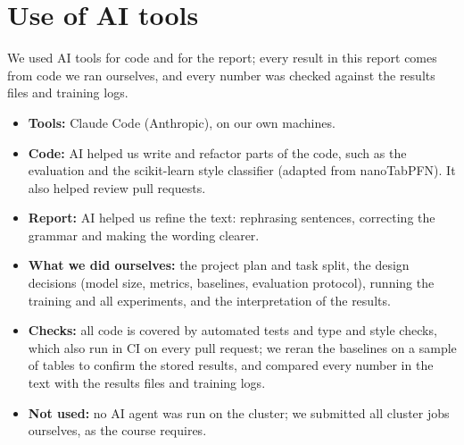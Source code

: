 \section*{Use of AI tools}  %

We used AI tools for code and for the report; every result in this report
comes from code we ran ourselves, and every number was checked against the
results files and training logs.

\begin{itemize}
  \item \textbf{Tools:} Claude Code (Anthropic), on our own machines.
  \item \textbf{Code:} AI helped us write and refactor parts of the code,
    such as the evaluation and the scikit-learn style classifier (adapted
    from nanoTabPFN).
    It also helped review pull requests.
  \item \textbf{Report:} AI helped us refine the text: rephrasing sentences,
    correcting the grammar and making the wording clearer.
  \item \textbf{What we did ourselves:} the project plan and task split, the
    design decisions (model size, metrics, baselines, evaluation protocol),
    running the training and all experiments, and the interpretation of the
    results.
  \item \textbf{Checks:} all code is covered by automated tests and type
    and style checks, which also run in CI on every pull request; we reran
    the baselines on a sample of tables to confirm the stored results, and
    compared every number in the text with the results files and training
    logs.
  \item \textbf{Not used:} no AI agent was run on the cluster; we submitted
    all cluster jobs ourselves, as the course requires.
\end{itemize}
